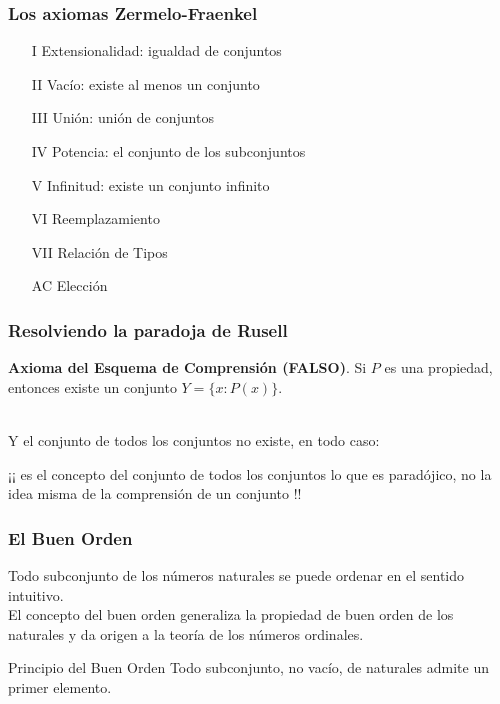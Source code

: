\begin{frame}
 \frametitle{Los axiomas Zermelo-Fraenkel}

\begin{enumerate}
	\item[I]	Extensionalidad: igualdad de conjuntos
	\item[II]	Vacío: existe al menos un conjunto
	\item[III]  Unión: unión de conjuntos
	\item[IV]	Potencia: el conjunto de los subconjuntos
	\item[V]	Infinitud: existe un conjunto infinito
	\item[VI]	Reemplazamiento %
	\item[VII]	Relación de Tipos %
	\item[AC]	Elección%
\end{enumerate}
\end{frame}

\begin{frame}
 \frametitle{Resolviendo la paradoja de Rusell}

\textbf{Axioma del Esquema de Comprensión (FALSO)}. Si $P$ es una propiedad, entonces existe un conjunto $Y = \{x: P(x)\}$.\\~

\pause
Y el conjunto de todos los conjuntos no existe, en todo caso: 
\begin{center}
 ¡¡ es el concepto del conjunto de todos los conjuntos lo que es paradójico, no la idea misma de la comprensión de un conjunto !!
\end{center}
\end{frame}

\begin{frame}
 \frametitle{El Buen Orden}
 
\justify
Todo subconjunto de los números naturales se puede ordenar en el sentido intuitivo.\\

\pause
El concepto del buen orden generaliza la propiedad de buen orden de los naturales y da origen a la teoría de los números ordinales.
 
\pause
\begin{block}{Principio del Buen Orden}
  Todo subconjunto, no vacío, de naturales admite un primer elemento.
\end{block}
\end{frame}

